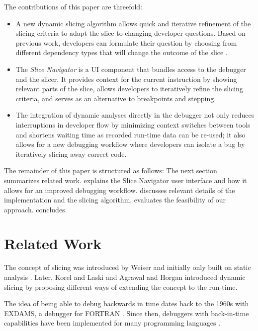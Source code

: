 ﻿\documentclass[
      english,
			conference,
      ]{IEEEtran}
\begin{document}
The contributions of this paper are threefold:
\begin{itemize}
	\item A new dynamic slicing algorithm allows quick and iterative refinement of the slicing criteria to adapt the slice to changing developer questions.
		Based on previous work, developers can formulate their question by choosing from different dependency types that will change the outcome of the slice \cite{treffer_dynamic_2014}.
	\item The \emph{Slice Navigator} is a UI component that bundles access to the debugger and the slicer.
		It provides context for the current instruction by showing relevant parts of the slice, allows developers to iteratively refine the slicing criteria, and serves as an alternative to breakpoints and stepping.
	\item The integration of dynamic analyses directly in the debugger not only reduces interruptions in developer flow by minimizing context switches between tools and shortens waiting time as recorded run-time data can be re-used; it also allows for a new debugging workflow where developers can isolate a bug by iteratively slicing away correct code.
\end{itemize}

The remainder of this paper is structured as follows:
The next section summarizes related work.
 explains the Slice Navigator user interface and how it allows for an improved debugging workflow.
 discusses relevant details of the implementation and the slicing algorithm.
 evaluates the feasibility of our approach.
 concludes.

\section{Related Work}

The concept of slicing was introduced by Weiser and initially only built on static analysis \cite{weiser_programmers_1982, weiser_program_1981}.
Later, Korel and Laski \cite{korel_dynamic_1990} and Agrawal and Horgan \cite{agrawal_dynamic_1990} introduced dynamic slicing by proposing different ways of extending the concept to the run-time.

The idea of being able to debug backwards in time dates back to the 1960s with EXDAMS, a debugger for FORTRAN \cite{balzer_exdams:_1969}.
Since then, debuggers with back-in-time capabilities have been implemented for many programming languages \cite{agrawal_debugging_1993, feldman_igor:_1988, lieberman_zstep_1995}.
\end{document}
